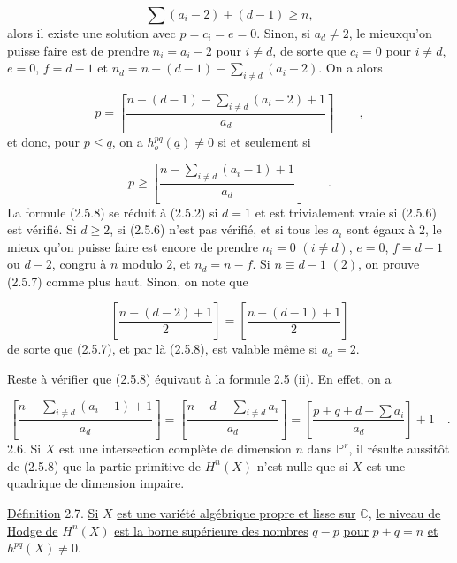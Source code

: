 \begin{equation}\tag{2.5.6}
\sum (a_i-2) + (d-1) \geq n,
\end{equation}
alors il existe une solution avec $p = c_i = e = 0$. Sinon, si $a_d \neq 2$, le mieuxqu'on puisse faire est de prendre $n_i = a_i - 2$ pour $i \neq d$, de sorte que $c_i = 0$ pour $i \neq d$, $e = 0$, $f = d-1$ et $n_d = n - (d-1) - \sum\limits_{i \neq d} (a_i-2)$. On a alors

\begin{equation}\tag{2.5.7}
p = \left[ \displaystyle\frac{n-(d-1) - \sum\limits_{i \neq d} (a_i-2) + 1}{a_d} \right] \qquad ,
\end{equation}
et donc, pour $p \leq q$, on a $h^{pq}_{o}(\underline{a}) \neq 0$ si et seulement si

\begin{equation}\tag{2.5.8}
p \geq \left[ \displaystyle\frac{n- \sum\limits_{i \neq d} (a_i-1) + 1}{a_d} \right] \qquad .
\end{equation}
La formule (2.5.8) se réduit à (2.5.2) si $d = 1$ et est trivialement vraie si (2.5.6) est vérifié. Si $d \geq 2$, si (2.5.6) n'est pas vérifié, et si tous les $a_i$ sont égaux à $2$, le mieux qu'on puisse faire est encore de
prendre $n_i = 0$ $(i \neq d)$, $e = 0$, $f = d-1$ ou $d-2$, congru à $n$ modulo $2$, et $n_d = n-f$. Si $n \equiv d-1$ $(2)$, on prouve (2.5.7) comme plus haut. Sinon, on note que

\begin{equation*}
\left[ \displaystyle\frac{n - (d-2) + 1}{2} \right] = \left[ \displaystyle\frac{n - (d-1) + 1}{2} \right]
\end{equation*}
de sorte que (2.5.7), et par là (2.5.8), est valable même si $a_d = 2$.

Reste à vérifier que (2.5.8) équivaut à la formule 2.5 (ii). En effet, on a

\begin{equation*}
\left[ \displaystyle\frac{n - \sum\limits_{i \neq d} (a_i-1) + 1}{a_d} \right] = \left[ \displaystyle\frac{n + d - \sum\limits_{i \neq d} a_i}{a_d} \right] = \left[ \displaystyle\frac{p + q + d - \sum a_i}{a_d} \right] + 1 \quad .
\end{equation*}
2.6. \quad Si $X$ est une intersection complète de dimension $n$ dans $\mathbb{P}^r$, il résulte aussitôt de (2.5.8) que la partie primitive de $H^n(X)$ n'est nulle que si $X$ est une quadrique de dimension impaire.

\underline{Définition} 2.7. \underline{Si} $X$ \underline{est une variété algébrique propre et lisse sur} $\mathbb{C}$, \underline{le niveau de Hodge de} $H^n(X)$ \underline{est la borne supérieure des nombres} $q-p$ \underline{pour} $p+q = n$ \underline{et} $h^{pq}(X) \neq 0$.

